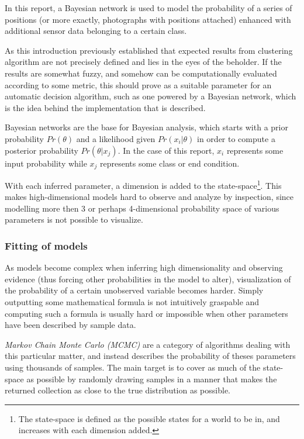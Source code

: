 
In this report, a Bayesian network is used to model the probability of a 
series of positions (or more exactly, photographs with positions attached)
enhanced with additional sensor data belonging to a certain class.

As this introduction previously established that expected results from 
clustering algorithm are not precisely defined and lies in the eyes of 
the beholder. If the results are somewhat fuzzy, and somehow can be 
computationally evaluated according to some metric, this should prove as 
a suitable parameter for an automatic decision algorithm, such as one 
powered by a Bayesian network, which is the idea behind the implementation
that is described. 

Bayesian networks are the base for Bayesian analysis, which starts with
a prior probability $ Pr(\theta) $ and a likelihood given $ Pr(x_i|\theta) $
in order to compute a posterior probability $ Pr(\theta|x_j) $. In the case
of this report, $ x_i $ represents some input probability while $ x_j $
represents some class or end condition.

With each inferred parameter, a dimension is added to the state-space\footnote{
    The state-space is defined as the possible states for a world to be in, and
    increases with each dimension added.
}. This makes high-dimensional models hard to observe and analyze by inspection, 
since modelling more then 3 or perhaps 4-dimensional probability space of 
various parameters is not possible to visualize. 

\subsubsection{Fitting of models}
As models become complex when inferring high dimensionality and observing
evidence (thus forcing other probabilities in the model to alter), 
visualization of the probability of a certain unobserved variable becomes
harder. Simply outputting some mathematical formula is not intuitively
graspable and computing such a formula is usually hard or impossible when other 
parameters have been described by sample data.

\emph{Markov Chain Monte Carlo (MCMC)} are a category of algorithms 
dealing with this particular matter, and instead describes the probability
of theses parameters using thousands of samples. The main target is to 
cover as much of the state-space as possible by randomly drawing samples
in a manner that makes the returned collection as close to the true 
distribution as possible. 

